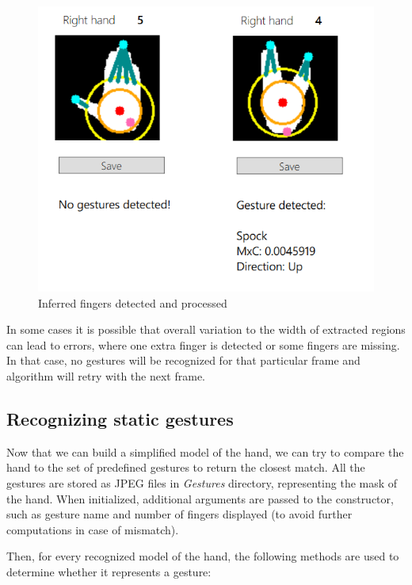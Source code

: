 \documentclass[a4paper,11pt,oneside]{article}
\begin{document}
\begin{figure}[H]
\centering
\includegraphics[scale=1]{inferred-fingers.png}
\caption{Inferred fingers detected and processed}
\end{figure}

In some cases it is possible that overall variation to the width of extracted regions can lead to errors, where one extra finger is detected or some fingers are missing. In that case, no gestures will be recognized for that particular frame and algorithm will retry with the next frame.

\subsection{Recognizing static gestures}

Now that we can build a simplified model of the hand, we can try to compare the hand to the set of predefined gestures to return the closest match. All the gestures are stored as JPEG files in \textit{Gestures} directory, representing the mask of the hand. When initialized,  additional arguments are passed to the constructor, such as gesture name and number of fingers displayed (to avoid further computations in case of mismatch).

Then, for every recognized model of the hand, the following methods are used to determine whether it represents a gesture:\\
\end{document}
